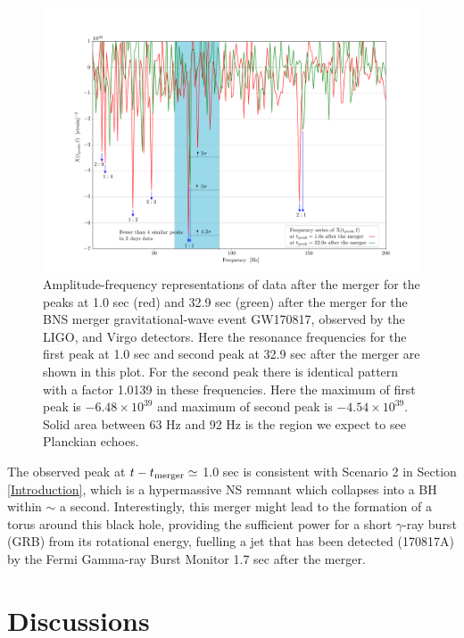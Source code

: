 \documentclass[12pt]{article}
\begin{document}
\begin{figure}[!tbp]
    \includegraphics[width=1\textwidth]{peaks_in_frequency.pdf}
 \caption{Amplitude-frequency representations of data after the merger for the peaks at 1.0 sec (red) and 32.9 sec (green) after the merger for the BNS merger gravitational-wave event GW170817, observed by the LIGO, and Virgo detectors. Here the resonance frequencies for the first peak at 1.0 sec and second peak at 32.9 sec after the merger are shown in this plot. For the second peak there is identical pattern with a factor 1.0139 in these frequencies. Here the maximum of first peak is $-6.48\times10^{39}$ and maximum of second peak is $-4.54 \times 10^{39}$. Solid area between 63 Hz and 92 Hz is the region we expect to see Planckian echoes.}
 \label{NS-NS_3}
\end{figure}

The observed peak at $t-t_{\rm{merger}} \simeq$ 1.0 sec is consistent with Scenario 2 in Section \ref{Introduction}, which is a hypermassive NS remnant \cite{Abbott:2017dke} which collapses into a BH within $\sim$ a second. Interestingly, this merger might lead to the formation of a torus around this black hole, providing the sufficient power for a short $\gamma$-ray burst (GRB) \cite{Kastaun:2013mv} from its rotational energy, fuelling a jet that has been detected (170817A) by the Fermi Gamma-ray Burst Monitor \cite{Goldstein:2017mmi,Monitor:2017mdv} 1.7 sec after the merger.

\section{\label{discuss} Discussions} 
\end{document}
